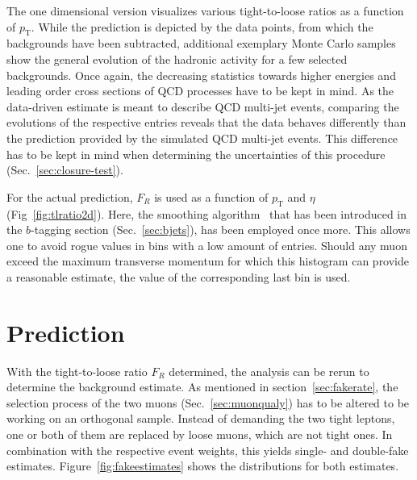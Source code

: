 The one dimensional version visualizes various tight-to-loose ratios as a function of $p_{\text{T}}$. While the prediction is depicted by the data points, from which the backgrounds have been subtracted, additional exemplary Monte Carlo samples show the general evolution of the hadronic activity for a few selected backgrounds. Once again, the decreasing statistics towards higher energies and leading order cross sections of QCD processes have to be kept in mind. As the data-driven estimate is meant to describe QCD multi-jet events, comparing the evolutions of the respective entries reveals that the data behaves differently than the prediction provided by the simulated QCD multi-jet events. This difference has to be kept in mind when determining the uncertainties of this procedure (Sec.~\ref{sec:closure-test}).  

For the actual prediction, $F_R$ is used as a function of $p_{\text{T}}$ and $\eta$ (Fig~\ref{fig:tlratio2d}). Here, the smoothing algorithm~\cite{rootsmooth} that has been introduced in the $b$-tagging section (Sec.~\ref{sec:bjets}), has been employed once more. This allows one to avoid rogue values in bins with a low amount of entries. Should any muon exceed the maximum transverse momentum for which this histogram can provide a reasonable estimate, the value of the corresponding last bin is used.

\section{Prediction}
\label{sec:tlprediction}

With the tight-to-loose ratio $F_R$ determined, the analysis can be rerun to determine the background estimate. As mentioned in section~\ref{sec:fakerate}, the selection process of the two muons (Sec.~\ref{sec:muonqualy}) has to be altered to be working on an orthogonal sample. Instead of demanding the two tight leptons, one or both of them are replaced by loose muons, which are not tight ones. In combination with the respective event weights, this yields single- and double-fake estimates. Figure~\ref{fig:fakeestimates} shows the distributions for both estimates.

